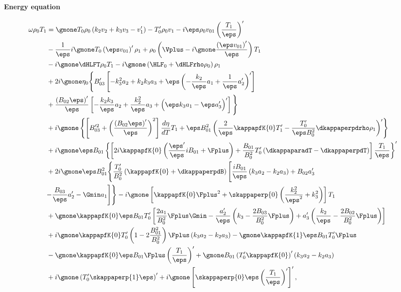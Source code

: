 {\customEquationFont
\paragraph{Energy equation}
\begin{equation} \label{eq: full_energy}
  \begin{aligned}
    \omega\rho_0T_1 &=
    \gmone T_0 \rho_0 \left(k_2 v_2 + k_3 v_3 -  v_1'\right) - T_0'\rho_0 v_1
    - i \eps \rho_0 v_{01} \left(\frac{T_1}{\eps}\right)' \\
    &
    - \frac{1}{\eps}i \gmone T_0 \left(\eps v_{01}\right)'\rho_1
    + \rho_0 \left(\Vplus - i \gmone\frac{\left(\eps v_{01}\right)'}{\eps} \right) T_1 \\
    &
    - i \gmone \dHLFT \rho_0 T_1  - i \gmone \left(\HLF_0 + \dHLFrho \rho_0\right) \rho_1 \\
    &
    + 2 i \gmone \eta_0 \Biggl\{ \Biggr.
      B_{03}'\left[-k_3^2a_2 + k_2 k_3 a_3 + \eps\left(-\frac{k_2}{\eps}a_1  + \frac{1}{\eps}a_2'\right)'\right] \\
    &
    + \frac{\left(B_{02} \eps\right)'}{\eps}\left[
      - \frac{k_2 k_3}{\eps}a_2 + \frac{k_2^2}{\eps} a_3 + \Bigl(\eps k_3 a_1 - \eps a_3'\Bigr)'
    \right] \Biggl. \Biggr\} \\
    &
    + i \gmone \left\{
      \left[B_{03}'^2 + \left(\frac{\left(B_{02} \eps\right)'}{\eps}\right)^2\right]\frac{d\eta}{dT} T_1
    + \eps B_{01}^2\left(\frac{2}{\eps}\kappapfK{0}T_1' - \frac{T_0'}{\eps B_0^2}\dkappaperpdrho \rho_1\right)'
    \right\} \\
    &
    + i\gmone \eps B_{01}\left\{
      \left[
        2 i \kappapfK{0}\left(\frac{\eps'}{\eps}iB_{01} + \Fplus\right)
        + \frac{B_{01}}{B_0^2}T_0'\left(\dkappaparadT - \dkappaperpdT\right)
      \right]\frac{T_1}{\eps}
    \right\}' \\
    &
    + 2i\gmone \eps B_{01}^2\Biggl\{
      \frac{T_0'}{B_0^2}\left(\kappapfK{0} + \dkappaperpdB\right)
      \Biggl[\frac{iB_{01}}{\eps}\left(k_3 a_2 - k_2 a_3\right) + B_{02}a_3' \Biggr.\Biggr. \\
    &
      \Biggl. \Biggl. - \frac{B_{03}}{\eps}a_2' - \Gmin a_1\Biggr]\Biggr\}
    - i \gmone \left[
      \kappapfK{0}\Fplus^2
      + \skappaperp{0}\left(\frac{k_2^2}{\eps^2} + k_3^2\right)
    \right] T_1 \\
    &
    + \gmone \kappapfK{0} \eps B_{01} T_0' \left[
        \frac{2 a_1}{B_0^2}\Fplus\Gmin - \frac{a_2'}{\eps}\left(k_3 - \frac{2 B_{03}}{B_0^2}\Fplus\right)
        + a_3'\left(\frac{k_2}{\eps} - \frac{2 B_{02}}{B_0^2}\Fplus\right)
    \right] \\
    &
    + i \gmone \kappapfK{0}T_0'\left(1 - 2\frac{B_{01}^2}{B_0^2}\right)\Fplus\left(k_3 a_2 - k_2 a_3\right)
    - \gmone \kappapfK{1}\eps B_{01}T_0'\Fplus \\
    &
    - \gmone \kappapfK{0} \eps B_{01} \Fplus \left(\frac{T_1}{\eps}\right)'
    + \gmone B_{01}\left(T_0' \kappapfK{0}\right)' \left(k_3 a_2 - k_2 a_3\right) \\
    &
    + i\gmone \left(T_0' \skappaperp{1}\eps\right)'
    + i\gmone \left[\skappaperp{0}\eps \left(\frac{T_1}{\eps}\right)'\right]',
  \end{aligned}
\end{equation}
}

